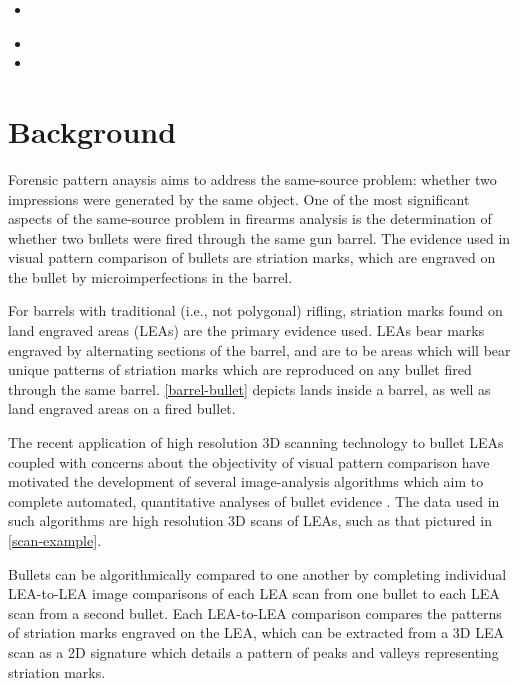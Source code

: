 \documentclass[12pt]{article}
\providecommand{\tightlist}{%
  \setlength{\itemsep}{0pt}\setlength{\parskip}{0pt}}
\begin{document}
\begin{itemize}
\tightlist
\item
  \\
\item
\item
\end{itemize}

\section{Background}

Forensic pattern anaysis aims to address the same-source problem:
whether two impressions were generated by the same object. One of the
most significant aspects of the same-source problem in firearms analysis
is the determination of whether two bullets were fired through the same
gun barrel. The evidence used in visual pattern comparison of bullets
are striation marks, which are engraved on the bullet by
microimperfections in the barrel.

For barrels with traditional (i.e., not polygonal) rifling, striation
marks found on land engraved areas (LEAs) are the primary evidence used.
LEAs bear marks engraved by alternating sections of the barrel, and are
 to be areas which will bear unique patterns of striation
marks which are reproduced on any bullet fired through the same
 barrel. \autoref{barrel-bullet} depicts lands inside a
barrel, as well as land engraved areas on a fired bullet.

The recent application of high resolution 3D scanning technology to
bullet LEAs coupled with concerns about the objectivity of visual
pattern comparison have motivated the development of several
image-analysis algorithms which aim to complete automated, quantitative
analyses of bullet evidence
\citep[see][]{DeKinder1, DeKinder2, Bachrach1, Ma1, Chu1, Chu2, Hare1}.
The data used in such algorithms are high resolution 3D scans of LEAs,
such as that pictured in \autoref{scan-example}.

Bullets can be algorithmically compared to one another by completing
individual LEA-to-LEA image comparisons of each LEA scan from one bullet
to each LEA scan from a second bullet. Each LEA-to-LEA comparison
compares the patterns of striation marks engraved on the LEA, which can
be extracted from a 3D LEA scan as a 2D signature which details a
pattern of peaks and valleys representing striation marks.
\end{document}
